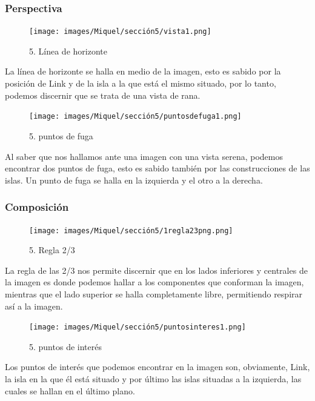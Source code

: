 \documentclass[12pt]{article}
\begin{document}
        \subsubsection{Perspectiva}

    \begin{figure}[H]
      \centering
      \texttt{[image: images/Miquel/sección5/vista1.png]}
      \caption{\small 5. Línea de horizonte}
    \end{figure}

    La línea de horizonte se halla en medio de la imagen, esto es sabido por la posición de Link y de la isla a la que está el mismo situado, por lo tanto, podemos discernir que se trata de una vista de rana.


    \begin{figure}[H]
      \centering
      \texttt{[image: images/Miquel/sección5/puntosdefuga1.png]}
      \caption{\small 5. puntos de fuga}
    \end{figure}

    Al saber que nos hallamos ante una imagen con una vista serena, podemos encontrar dos puntos de fuga, esto es sabido también por las construcciones  de las islas. Un punto de fuga se halla en la izquierda y el otro a la derecha.


        \subsubsection{Composición}
    \begin{figure}[H]
      \centering
      \texttt{[image: images/Miquel/sección5/1regla23png.png]}
      \caption{\small 5. Regla 2/3}
    \end{figure}
    
    La regla de las 2/3 nos permite discernir que en los lados inferiores y centrales de la imagen es donde podemos hallar a los componentes que conforman la imagen, mientras que el lado superior se halla completamente libre, permitiendo respirar así a la imagen.

    \begin{figure}[H]
      \centering
      \texttt{[image: images/Miquel/sección5/puntosinteres1.png]}
      \caption{\small 5. puntos de interés}
    \end{figure}

    Los puntos de interés que podemos encontrar en la imagen son, obviamente, Link, la isla en la que él está situado y por último las islas situadas a la izquierda, las cuales se hallan en el último plano.
\end{document}
